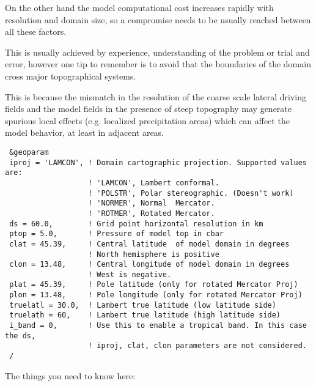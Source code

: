 On the other hand the model computational cost increases rapidly with
resolution and domain size, so a compromise needs to be usually reached
between all these factors.

This is usually achieved by experience, understanding of the problem or
trial and error, however one tip to remember is to avoid that the boundaries
of the domain cross major topographical systems.

This is because the mismatch in the resolution of the coarse scale lateral
driving fields and the model fields in the presence of steep topography may
generate spurious local effects (e.g. localized precipitation areas) which can
affect the model behavior, at least in adjacent areas. 

{\footnotesize
\begin{Verbatim}
 &geoparam
 iproj = 'LAMCON', ! Domain cartographic projection. Supported values are:
                   ! 'LAMCON', Lambert conformal.
                   ! 'POLSTR', Polar stereographic. (Doesn't work)
                   ! 'NORMER', Normal  Mercator.
                   ! 'ROTMER', Rotated Mercator.
 ds = 60.0,        ! Grid point horizontal resolution in km
 ptop = 5.0,       ! Pressure of model top in cbar
 clat = 45.39,     ! Central latitude  of model domain in degrees
                   ! North hemisphere is positive
 clon = 13.48,     ! Central longitude of model domain in degrees
                   ! West is negative.
 plat = 45.39,     ! Pole latitude (only for rotated Mercator Proj)
 plon = 13.48,     ! Pole longitude (only for rotated Mercator Proj)
 truelatl = 30.0,  ! Lambert true latitude (low latitude side)
 truelath = 60,    ! Lambert true latitude (high latitude side)
 i_band = 0,       ! Use this to enable a tropical band. In this case the ds,
                   ! iproj, clat, clon parameters are not considered.
 /
\end{Verbatim}
}

The things you need to know here:

